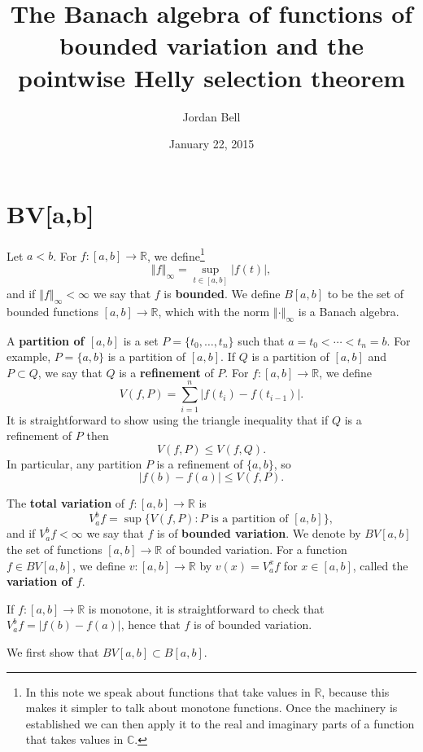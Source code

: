 \documentclass{article}
\newcommand{\norm}[1]{\left\Vert #1 \right\Vert}
\theoremstyle{definition}
\begin{document}
\title{The Banach algebra of functions of bounded variation and the pointwise Helly selection theorem}
\author{Jordan Bell}
\date{January 22, 2015}

\maketitle

\section{BV[a,b]}
Let $a<b$. For $f:[a,b] \to \mathbb{R}$, we define\footnote{In this note we speak about functions that take values in $\mathbb{R}$, because
this makes it simpler to talk about monotone functions. Once the machinery is established we can
then apply it to the real and imaginary parts of a function that takes values in $\mathbb{C}$.}
\[
\norm{f}_\infty = \sup_{t \in [a,b]} |f(t)|,
\]
and if $\norm{f}_\infty<\infty$ we say that $f$ is \textbf{bounded}. We define
$B[a,b]$ to be the set of bounded functions $[a,b] \to \mathbb{R}$, which with the norm $\norm{\cdot}_\infty$ is a Banach algebra.



A \textbf{partition of $[a,b]$} is a set
$P=\{t_0,\ldots,t_n\}$ such that $a=t_0<\cdots<t_n=b$. For example, $P=\{a,b\}$ is a partition of $[a,b]$.
If $Q$ is a partition of $[a,b]$ and $P \subset Q$, we say that $Q$ is a \textbf{refinement} of $P$.
For $f:[a,b] \to \mathbb{R}$,
 we define
\[
V(f,P) = \sum_{i=1}^n |f(t_i)-f(t_{i-1})|.
\]
It is straightforward to show using the triangle inequality that if $Q$ is a refinement of $P$ then
\[
V(f,P) \leq V(f,Q).
\]
In particular, any partition $P$ is a refinement of $\{a,b\}$, so
\[
|f(b)-f(a)| \leq V(f,P).
\]


The \textbf{total variation} of $f:[a,b] \to \mathbb{R}$ is 
\[
V_a^b f = \sup \{V(f,P): \textrm{$P$ is a partition of $[a,b]$}\},
\]
and if $V_a^b f <\infty$ we say that $f$ is of \textbf{bounded variation}. We denote by $BV[a,b]$ the set of functions $[a,b] \to \mathbb{R}$ of bounded
variation. 
For a function $f \in BV[a,b]$, we define 
$v:[a,b] \to \mathbb{R}$ by $v(x)=V_a^x f$ for $x \in [a,b]$, called
the \textbf{variation of $f$}.

If $f:[a,b] \to \mathbb{R}$ is monotone, it is straightforward to check that
$V_a^b f =|f(b)-f(a)|$,
 hence that $f$
is of bounded variation.


We first show that $BV[a,b] \subset B[a,b]$.
\end{document}
